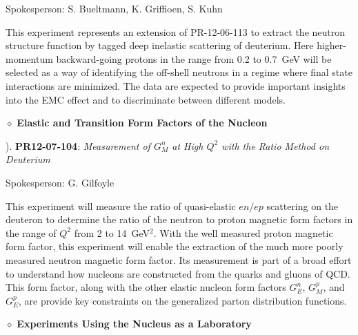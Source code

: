 \begin{small}
\begin{footnotesize}
Spokesperson: S. Bueltmann, K. Griffioen, S. Kuhn
\end{footnotesize}

\vskip 0.2cm

This experiment represents an extension of PR-12-06-113 to extract the
neutron structure function by tagged deep inelastic scattering of
deuterium.  Here higher-momentum backward-going protons in the range
from 0.2 to 0.7~GeV will be selected as a way of identifying the off-shell 
neutrons in a regime where final state interactions are minimized.  The data 
are expected
to provide important insights into the EMC effect and to discriminate
between different models.
\end{small}

\vskip 0.5cm

\noindent
\begin{large}
$\diamond$ {\bf Elastic and Transition Form Factors of the Nucleon}
\end{large}

\vskip 0.3cm

\begin{small}
). {\bf PR12-07-104}: {\it Measurement of $G_M^n$ at High $Q^2$ with 
the Ratio Method on Deuterium}

\vskip 0.2cm

\begin{footnotesize}
Spokesperson: G. Gilfoyle
\end{footnotesize}

\vskip 0.2cm

This experiment will measure the ratio of quasi-elastic $en/ep$
scattering on the deuteron to determine the ratio of the neutron to 
proton magnetic form factors in the range of $Q^2$ from 2 to 14~GeV$^2$.  
With the well measured proton magnetic form factor, this experiment will 
enable the extraction of the much more poorly measured neutron magnetic 
form factor.  Its measurement is part of a broad effort to understand 
how nucleons are constructed from the quarks and gluons of QCD.  This 
form factor, along with the other elastic nucleon form factors $G_E^n$, 
$G_M^p$, and $G_E^p$, are provide key constraints on the generalized 
parton distribution functions.
\end{small}

\vskip 0.5cm

\noindent
\begin{large}
$\diamond$ {\bf Experiments Using the Nucleus as a Laboratory}
\end{large}

